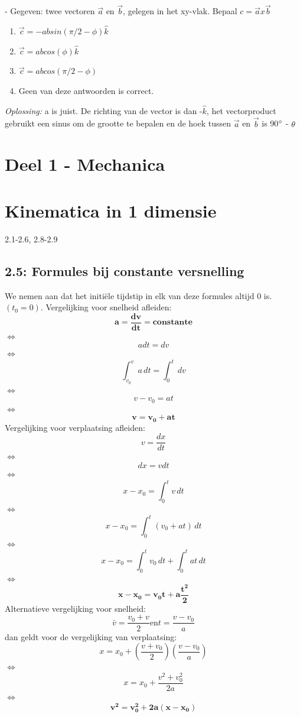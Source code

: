 \documentclass[12pt,a4paper]{article}
\begin{document}
    \newline
    - Gegeven: twee vectoren $\vec{a}$ en $\vec{b}$, gelegen in het xy-vlak. Bepaal \(c = \vec{a} x \vec{b}\)
    \begin{enumerate}
        [label=\alph*)]
        \item \(\vec{c} = - ab sin(\pi/2 - \phi)\hat{k}\)
        \item \(\vec{c} = abcos(\phi)\hat{k}\)
        \item \(\vec{c} = abcos(\pi/2 - \phi)\)
        \item Geen van deze antwoorden is correct.
    \end{enumerate}
    \textit{Oplossing:} a is juist. De richting van de vector is dan -$\hat{k}$, het vectorproduct gebruikt een sinus om de grootte te bepalen en de hoek tussen $\vec{a}$ en $\vec{b}$ is 90$\degree$ - $\theta$
    \newpage


    \section{Deel 1 - Mechanica}


    \section{Kinematica in 1 dimensie}
    2.1-2.6, 2.8-2.9

    \subsection{2.5: Formules bij constante versnelling}
    We nemen aan dat het initiële tijdstip in elk van deze formules altijd 0 is. \((t_{0} = 0)\).
    Vergelijking voor snelheid afleiden:
    \[\mathbf{a = \frac{dv}{dt} = constante}\]
    $\iff$ \[a dt = dv\]
    $\iff$ \[\int_{v_0}^{v} a \, dt = \int_{0}^{t} \,dv\]
    $\iff$\[v - v_0 = at\]
    $\iff$\[\mathbf{v = v_0 + at}\]
    Vergelijking voor verplaatsing afleiden:
    \[v = \frac{dx}{dt}\]
    $\iff$\[dx = v dt\]
    $\iff$\[x - x_0 = \int_{0}^{t} v \, dt\]
    $\iff$\[x - x_0 = \int_{0}^{t} (v_0 + at) \, dt\]
    $\iff$\[x - x_0 = \int_{0}^{t} v_0 \, dt + \int_{0}^{t} at \, dt\]
    $\iff$\[\mathbf{x - x_0 = v_0t + a\frac{t^2}{2}}\]
    Alternatieve vergelijking voor snelheid:
    \[\bar{v} = \frac{v_0 + v}{2} \text{en} t = \frac{v - v_0}{a}\]
    dan geldt voor de vergelijking van verplaatsing:
    \[x = x_0 + (\frac{v + v_0}{2})(\frac{v - v_0}{a})\]
    $\iff$\[x = x_0 + \frac{v^2 + v_0^2}{2a}\]
    $\iff$\[\mathbf{v^2 = v_0^2 + 2a(x - x_0)}\]
\end{document}
